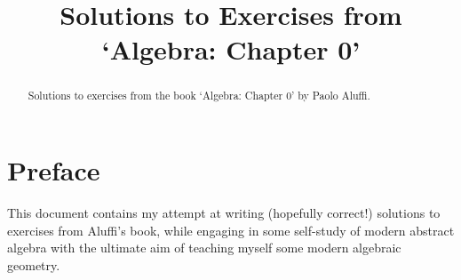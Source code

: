 \documentclass[]{amsbook}
\theoremstyle{plain}
\numberwithin{equation}{section}
\theoremstyle{definition}
\newcommand{\0}{\mathbf{0}}
\newcommand{\1}{\mathbf{1}}
\begin{document}
\frontmatter
\title[`Algebra: Chapter 0']{Solutions to Exercises from `Algebra: Chapter 0'}

\begin{abstract}
Solutions to exercises from the book `Algebra: Chapter 0' by Paolo Aluffi.
\end{abstract}

\maketitle
\tableofcontents

\chapter*{Preface}

 This document contains my attempt at writing
(hopefully correct!) solutions to exercises from Aluffi's book, while engaging
in some self-study of modern abstract algebra with the ultimate aim of teaching
myself some modern algebraic geometry.
\mainmatter



\end{document}
